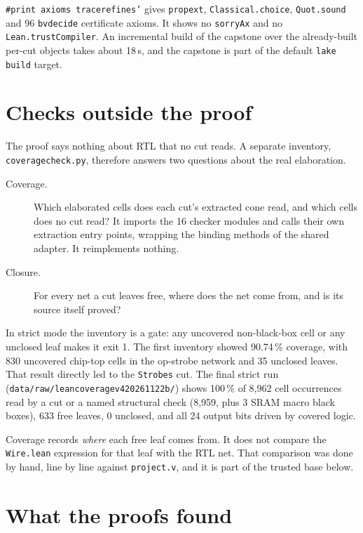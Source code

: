 \documentclass[11pt,a4paper]{article}
\newcommand{\brkus}{\textunderscore\allowbreak}
\newcommand{\code}[1]{{\let\_\brkus\texttt{#1}}}
\begin{document}
\code{\#print axioms trace\_refines'} gives \code{propext},
\code{Classical.choice}, \code{Quot.sound} and 96 \code{bv\_decide} certificate
axioms. It shows no \code{sorryAx} and no \code{Lean.trustCompiler}. An
incremental build of the capstone over the already-built per-cut objects
takes about 18\,s, and the capstone is part of the default \code{lake build}
target.

\section{Checks outside the proof}
\label{sec:coverage}

The proof says nothing about RTL that no cut reads. A separate inventory,
\code{coverage\_check.py}, therefore answers two questions about the real
elaboration.
\begin{description}
\item[Coverage.] Which elaborated cells does each cut's extracted cone read,
  and which cells does no cut read? It imports the 16 checker modules and
  calls their own extraction entry points, wrapping the binding methods of the
  shared adapter. It reimplements nothing.
\item[Closure.] For every net a cut leaves free, where does the net come from,
  and is its source itself proved?
\end{description}
In strict mode the inventory is a gate: any uncovered non-black-box cell or any
unclosed leaf makes it exit 1. The first inventory showed 90.74\,\% coverage,
with 830 uncovered chip-top cells in the op-strobe network and 35 unclosed
leaves. That result directly led to the \code{Strobes} cut. The final strict
run (\code{data/raw/lean\_coverage\_v4\_20261122b/}) shows 100\,\% of 8,962
cell occurrences read by a cut or a named structural check (8,959, plus 3 SRAM
macro black boxes), 633 free leaves, 0 unclosed, and all 24 output bits driven
by covered logic.

Coverage records \emph{where} each free leaf comes from. It does not compare
the \code{Wire.lean} expression for that leaf with the RTL net. That comparison
was done by hand, line by line against \code{project.v}, and it is part of the
trusted base below.

\section{What the proofs found}
\label{sec:findings}
\end{document}
